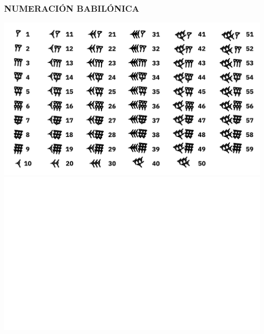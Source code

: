 \begin{frame}
  \frametitle{NUMERACIÓN BABILÓNICA}

  \begin{center}
    \ifdefined\handout
    \includegraphics[width=\textwidth]{pic/babylonian-white.pdf}
    \else
    \includegraphics[width=\textwidth]{pic/babylonian.pdf}
    \fi
  \end{center}
\end{frame}

